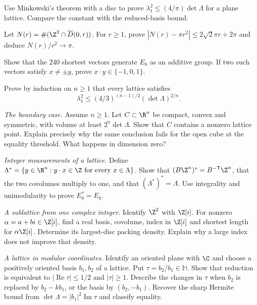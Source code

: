 \begin{exercise}[$\star\star$]\label{geometry:ex:minkowskibound}
Use Minkowski's theorem with a disc to prove
$\lambda_1^2\le(4/\pi)\det\Lambda$ for a plane lattice.
Compare the constant with the reduced-basis bound.
\end{exercise}
\begin{exercise}[$\star\star$]\label{geometry:ex:circlecount}
Let $N(r)=\#(\Z^2\cap\overline D(0,r))$.
For $r\ge1$, prove
$|N(r)-\pi r^2|\le2\sqrt2\pi r+2\pi$ and deduce $N(r)/r^2\to\pi$.
\end{exercise}
\begin{exercise}[$\star$]\label{geometry:ex:e8roots}
Show that the $240$ shortest vectors generate $E_8$ as an additive group.
If two such vectors satisfy $x\ne\pm y$, prove
$x\cdot y\in\{-1,0,1\}$.
\end{exercise}
\begin{exercise}[$\star\star\star$]\label{geometry:ex:hermite}
Prove by induction on $n\ge1$ that every lattice satisfies
\[
 \lambda_1^2\le(4/3)^{(n-1)/2}(\det\Lambda)^{2/n}.
\]
\end{exercise}

\begin{exercise}[$\star\star$]\label{geometry:ex:v9-closed-minkowski}
\emph{The boundary case.} Assume $n\ge1$. Let $C\subset\R^n$ be compact, convex and
symmetric, with volume at least $2^n\det\Lambda$.
Show that $C$ contains a nonzero lattice point. Explain precisely why the
same conclusion fails for the open cube at the equality threshold.
What happens in dimension zero?
\end{exercise}
\begin{exercise}[$\star\star$]\label{geometry:ex:v9-dual-lattice}
\emph{Integer measurements of a lattice.} Define
$\Lambda^*=\{y\in\R^n:y\cdot x\in\Z\text{ for every }x\in\Lambda\}$.
Show that $(B\Z^n)^*=B^{-\mathsf T}\Z^n$, that the two covolumes
multiply to one, and that $(\Lambda^*)^*=\Lambda$.
Use integrality and unimodularity to prove $E_8^*=E_8$.
\end{exercise}
\begin{exercise}[$\star\star$]\label{geometry:ex:v9-complex-lattice}
\emph{A sublattice from one complex integer.} Identify $\Z^2$ with
$\Z[i]$. For nonzero $\alpha=a+bi\in\Z[i]$, find a real basis,
covolume, index in $\Z[i]$ and shortest length for $\alpha\Z[i]$.
Determine its largest-disc packing density. Explain why a large index
does not improve that density.
\end{exercise}
\begin{exercise}[$\star\star$]\label{geometry:ex:v9-reduction-domain}
\emph{A lattice in modular coordinates.} Identify an oriented plane with
$\C$ and choose a positively oriented basis $b_1,b_2$ of a lattice.
Put $\tau=b_2/b_1\in\mathbb H$.
Show that reduction is equivalent to $|\operatorname{Re}\tau|\le1/2$
and $|\tau|\ge1$. Describe the changes in $\tau$ when $b_2$ is replaced
by $b_2-kb_1$, or the basis by $(b_2,-b_1)$.
Recover the sharp Hermite bound from
$\det\Lambda=|b_1|^2\operatorname{Im}\tau$ and classify equality.
\end{exercise}

